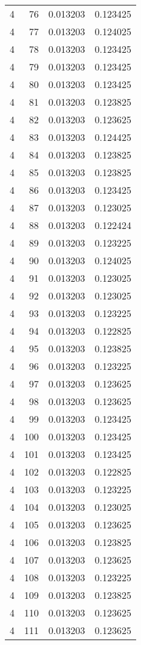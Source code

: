 \begin{longtable}{rrrr}
4 & 76 & 0.013203 & 0.123425 \\
4 & 77 & 0.013203 & 0.124025 \\
4 & 78 & 0.013203 & 0.123425 \\
4 & 79 & 0.013203 & 0.123425 \\
4 & 80 & 0.013203 & 0.123425 \\
4 & 81 & 0.013203 & 0.123825 \\
4 & 82 & 0.013203 & 0.123625 \\
4 & 83 & 0.013203 & 0.124425 \\
4 & 84 & 0.013203 & 0.123825 \\
4 & 85 & 0.013203 & 0.123825 \\
4 & 86 & 0.013203 & 0.123425 \\
4 & 87 & 0.013203 & 0.123025 \\
4 & 88 & 0.013203 & 0.122424 \\
4 & 89 & 0.013203 & 0.123225 \\
4 & 90 & 0.013203 & 0.124025 \\
4 & 91 & 0.013203 & 0.123025 \\
4 & 92 & 0.013203 & 0.123025 \\
4 & 93 & 0.013203 & 0.123225 \\
4 & 94 & 0.013203 & 0.122825 \\
4 & 95 & 0.013203 & 0.123825 \\
4 & 96 & 0.013203 & 0.123225 \\
4 & 97 & 0.013203 & 0.123625 \\
4 & 98 & 0.013203 & 0.123625 \\
4 & 99 & 0.013203 & 0.123425 \\
4 & 100 & 0.013203 & 0.123425 \\
4 & 101 & 0.013203 & 0.123425 \\
4 & 102 & 0.013203 & 0.122825 \\
4 & 103 & 0.013203 & 0.123225 \\
4 & 104 & 0.013203 & 0.123025 \\
4 & 105 & 0.013203 & 0.123625 \\
4 & 106 & 0.013203 & 0.123825 \\
4 & 107 & 0.013203 & 0.123625 \\
4 & 108 & 0.013203 & 0.123225 \\
4 & 109 & 0.013203 & 0.123825 \\
4 & 110 & 0.013203 & 0.123625 \\
4 & 111 & 0.013203 & 0.123625 \\

\end{longtable}

